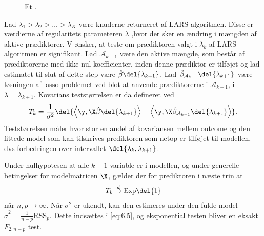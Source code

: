 %
\begin{figure}[H]
\centering
\caption{Et .}
\label{fig:covarians_test}
\end{figure}
%



Lad $\lambda_1 > \lambda_2 > \ldots > \lambda_K$ være knuderne returneret af LARS algoritmen.
Disse er værdierne af regularitets parameteren $\lambda$ ,hvor der sker en ændring i mængden af aktive prædiktorer.
V ønsker, at teste om prædiktoren valgt i \(\lambda_k\) af LARS algoritmen er signifikant.
Lad \(\mathcal{A}_{k-1}\) være den aktive mængde, som består af prædiktorerne med ikke-nul koefficienter, inden denne prædiktor er tilføjet og lad estimatet til slut af dette step være \(\hat{\beta} \del{\lambda_{k+1}}\).
Lad \(\hat{\beta}_{\mathcal{A}_{k-1}} \del{\lambda_{k+1}}\) være løsningen af lasso problemet ved blot at anvende prædiktorerne  i \(\mathcal{A}_{k-1}\), i \(\lambda=\lambda_{k+1}\).
Kovarians teststørrelsen er da defineret ved
\begin{align}
T_k = \frac{1}{\sigma^2} \del{ \left\langle \y, \X \hat{\beta} \del{\lambda_{k+1}} \right\rangle - \left\langle  \y, \X \hat{\beta}_{\mathcal{A}_{k-1}} \del{\lambda_{k+1}} \right\rangle}. \label{eq:6.5}
\end{align}
Teststørrelsen måler hvor stor en andel af kovariansen mellem outcome og den fittede model som kan tilskrives prediktoren som netop er tilføjet til modellen, dvs forbedringen over intervallet \(\del{\lambda_k, \lambda_{k+1}}\).

Under nulhypotesen at alle $k-1$ variable er i modellen, og under generelle betingelser for modelmatricen $\X$, gælder der for prediktoren i næste trin at
\begin{align*}
T_k \overset{d}{\rightarrow} \text{Exp}\del{1}
\end{align*}
når \(n, p \rightarrow \infty\).
Når \(\sigma^2\) er ukendt, kan den estimeres under den fulde model \(\hat{\sigma}^2 = \frac{1}{n-p} \text{RSS}_p\). 
Dette indsættes i \eqref{eq:6.5}, og eksponential testen bliver en eksakt \(F_{2,n-p}\) test.

